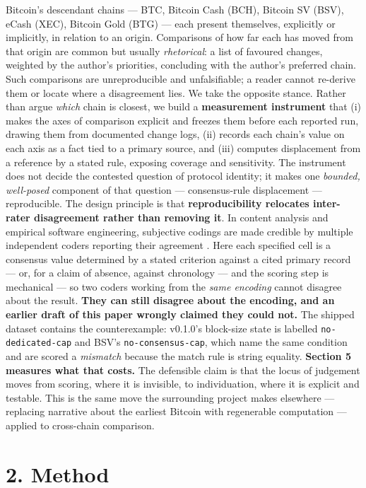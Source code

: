 \documentclass[
]{article}
\begin{document}
Bitcoin's descendant chains --- BTC, Bitcoin Cash (BCH), Bitcoin SV
(BSV), eCash (XEC), Bitcoin Gold (BTG) --- each present themselves,
explicitly or implicitly, in relation to an origin. Comparisons of how
far each has moved from that origin are common but usually
\emph{rhetorical}: a list of favoured changes, weighted by the author's
priorities, concluding with the author's preferred chain. Such
comparisons are unreproducible and unfalsifiable; a reader cannot
re-derive them or locate where a disagreement lies. We take the opposite
stance. Rather than argue \emph{which} chain is closest, we build a
\textbf{measurement instrument} that (i) makes the axes of comparison
explicit and freezes them before each reported run, drawing them from
documented change logs, (ii) records each chain's value on each axis as
a fact tied to a primary source, and (iii) computes displacement from a
reference by a stated rule, exposing coverage and sensitivity. The
instrument does not decide the contested question of protocol identity;
it makes one \emph{bounded, well-posed} component of that question ---
consensus-rule displacement --- reproducible. The design principle is
that \textbf{reproducibility relocates inter-rater disagreement rather
than removing it}. In content analysis and empirical software
engineering, subjective codings are made credible by multiple
independent coders reporting their agreement
\citep{krippendorff, easterbrook}. Here each specified cell is a
consensus value determined by a stated criterion against a cited primary
record --- or, for a claim of absence, against chronology --- and the
scoring step is mechanical --- so two coders working from the \emph{same
encoding} cannot disagree about the result. \textbf{They can still
disagree about the encoding, and an earlier draft of this paper wrongly
claimed they could not.} The shipped dataset contains the
counterexample: v0.1.0's block-size state is labelled
\texttt{no-dedicated-cap} and BSV's \texttt{no-consensus-cap}, which
name the same condition and are scored a \emph{mismatch} because the
match rule is string equality. \textbf{Section 5 measures what that
costs.} The defensible claim is that the locus of judgement moves from
scoring, where it is invisible, to individuation, where it is explicit
and testable. This is the same move the surrounding project makes
elsewhere --- replacing narrative about the earliest Bitcoin with
regenerable computation \citep{saxena_beforegenesis, saxena_ledger} ---
applied to cross-chain comparison.

\section{2. Method}\label{method}
\end{document}
